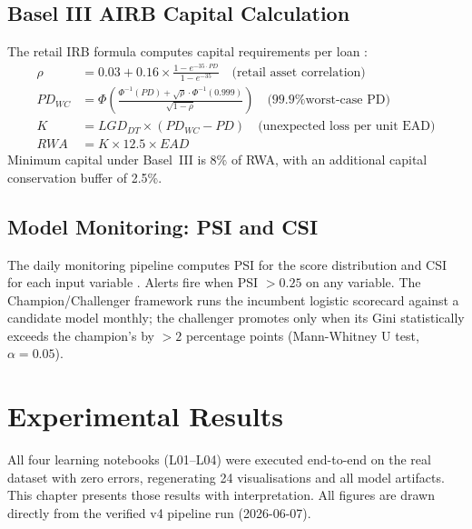 \documentclass[12pt,a4paper]{report}
\begin{document}
\section{Basel III AIRB Capital Calculation}

The retail IRB formula computes capital requirements per loan \cite{bcbs2004, bcbs2022}:
\begin{align}
  \rho &= 0.03 + 0.16 \times \frac{1 - e^{-35 \cdot PD}}{1 - e^{-35}} \quad \text{(retail asset correlation)} \\
  PD_{WC} &= \Phi\!\left(\frac{\Phi^{-1}(PD) + \sqrt{\rho} \cdot \Phi^{-1}(0.999)}{\sqrt{1-\rho}}\right) \quad \text{(99.9\% worst-case PD)} \\
  K &= LGD_{DT} \times (PD_{WC} - PD) \quad \text{(unexpected loss per unit EAD)} \\
  RWA &= K \times 12.5 \times EAD
\end{align}
Minimum capital under Basel~III is 8\% of RWA, with an additional capital conservation buffer of 2.5\%.

\section{Model Monitoring: PSI and CSI}

The daily monitoring pipeline computes PSI for the score distribution and CSI for each input variable \cite{garp2021, arthur_ai2025}. Alerts fire when PSI $> 0.25$ on any variable. The Champion/Challenger framework runs the incumbent logistic scorecard against a candidate model monthly; the challenger promotes only when its Gini statistically exceeds the champion's by $> 2$ percentage points (Mann-Whitney U test, $\alpha = 0.05$).

\chapter{Experimental Results}
\label{ch:results}

All four learning notebooks (L01--L04) were executed end-to-end on the real dataset with zero errors, regenerating 24 visualisations and all model artifacts. This chapter presents those results with interpretation. All figures are drawn directly from the verified v4 pipeline run (2026-06-07).

\end{document}
